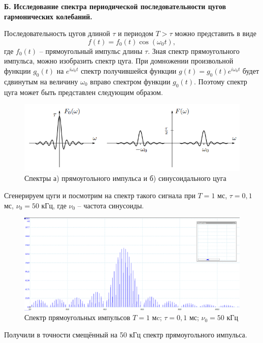 \documentclass[a4paper,12pt]{article}
\begin{document}
\textbf{Б. Исследование спектра периодической последовательности цугов гармонических колебаний.}

Последовательность цугов длиной $\tau$ и периодом $T > \tau$ можно представить в виде 
\[f(t) = f_0(t)\cos(\omega_0 t),\]
где $f_0(t)$ -- прямоугольный импульс длины $\tau$. Зная спектр прямоугольного импульса, можно изобразить спектр цуга. При домножении произвольной функции $g_0(t)$ на $e^{i \omega_0 t}$ спектр получившейся функции $g(t) = g_0(t)e^{i \omega_0 t}$ будет сдвинутым на величину $\omega_0$ вправо спектром функции $g_0(t)$. Поэтому спектр цуга может быть представлен следующим образом.
\begin{figure}[H]\label{fig: Zuch and impuls spektr}
    \centering
    \includegraphics[width = \textwidth]{Импульс и цуг спектр.png}
    \caption{Спектры а) прямоугольного импульса и б) синусоидального цуга}
\end{figure}
Сгенерируем цуги и посмотрим на спектр такого сигнала при $T = 1$ мс, $\tau = 0,1$ мс, $\nu_0 = 50$ кГц, где $\nu_0$ -- частота синусоиды.
\begin{figure}[H]\label{fig: 50kHz_1ms_5N}
    \centering
    \includegraphics[width =\textwidth]{50kHz_1ms_5N.png}
    \caption{Спектр прямоугольных импульсов $T = 1$ мc; $\tau = 0,1$ мс; $\nu_0 = 50$ кГц}
\end{figure}
Получили в точности смещённый на 50 кГц спектр прямоугольного импульса.
\end{document}
